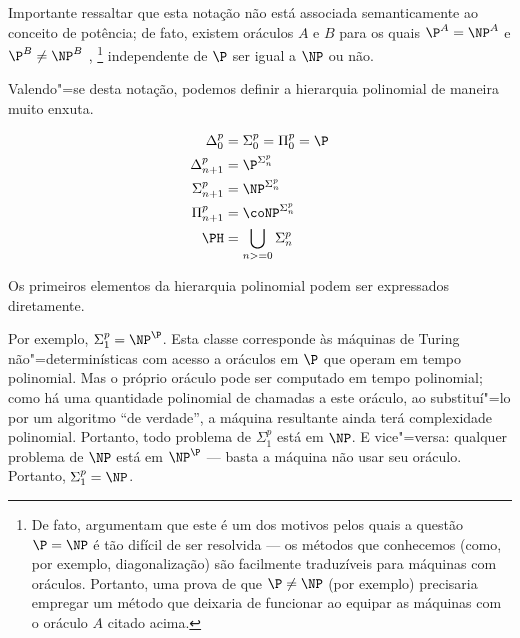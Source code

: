 Importante ressaltar que esta notação
não está associada semanticamente ao conceito de potência;
de fato,
existem oráculos $A$ e $B$ para os quais
$\P ^ A = \NP ^ A$ e $\P ^ B \neq \NP ^ B$
\cite[p.~362]{HopcroftUllman1979},%
\footnote{
    De fato, 
    argumentam que este é um dos motivos pelos quais
    a questão $\P = \NP$ é tão difícil de ser resolvida
    --- os métodos que conhecemos
    (como, por exemplo, diagonalização)
    são facilmente traduzíveis para máquinas com oráculos.
    Portanto,
    uma prova de que $\P \neq \NP$ (por exemplo)
    precisaria empregar um método que deixaria de funcionar
    ao equipar as máquinas com o oráculo $A$ citado acima.
}
independente de $\P$ ser igual a $\NP$ ou não.

Valendo"=se desta notação,
podemos definir a hierarquia polinomial de maneira muito enxuta.

\begin{definition}
    \begin{align*}
        \Delta_0^p &= \Sigma_0^p = \Pi_0^p = \P \\
        \Delta_{n+1}^p &= \P^{\Sigma_n^p} \\
        \Sigma_{n+1}^p &= \NP^{\Sigma_n^p} \\
        \Pi_{n+1}^p &= \coNP^{\Sigma_n^p} \\
        \PH &= \bigcup_{n >= 0} \Sigma_n^p
    \end{align*}
\end{definition}

Os primeiros elementos da hierarquia polinomial podem ser expressados diretamente.

Por exemplo, $\Sigma_1^p = \NP^\P$.
Esta classe corresponde às máquinas de Turing não"=determinísticas
com acesso a oráculos em $\P$ que operam em tempo polinomial.
Mas o próprio oráculo pode ser computado em tempo polinomial;
como há uma quantidade polinomial de chamadas a este oráculo,
ao substituí"=lo por um algoritmo ``de verdade'',
a máquina resultante ainda terá complexidade polinomial.
Portanto, todo problema de $\Sigma_1^p$ está em $\NP$.
E vice"=versa: qualquer problema de $\NP$ está em $\NP^\P$
--- basta a máquina não usar seu oráculo.
Portanto, $\Sigma_1^p = \NP$.

